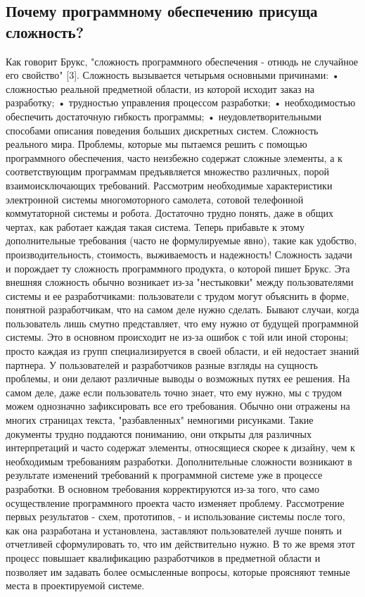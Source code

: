 \documentclass[11pt]{article}
\begin{document}
    	\subsection{Почему программному обеспечению присуща сложность? }
    	Как говорит Брукс, "сложность программного обеспечения - отнюдь не случайное его свойство" [3]. Сложность вызывается четырьмя основными причинами: 
    • сложностью реальной предметной области, из которой исходит заказ на разработку;
    • трудностью управления процессом разработки;
    • необходимостью обеспечить достаточную гибкость программы;
    • неудовлетворительными способами описания поведения больших дискретных систем.
Сложность реального мира. Проблемы, которые мы пытаемся решить с помощью программного обеспечения, часто неизбежно содержат сложные элементы, а к соответствующим программам предъявляется множество различных, порой взаимоисключающих требований. Рассмотрим необходимые характеристики электронной системы многомоторного самолета, сотовой телефонной коммутаторной системы и робота. Достаточно трудно понять, даже в общих чертах, как работает каждая такая система. Теперь прибавьте к этому дополнительные требования (часто не формулируемые явно), такие как удобство, производительность, стоимость, выживаемость и надежность! Сложность задачи и порождает ту сложность программного продукта, о которой пишет Брукс. 
Эта внешняя сложность обычно возникает из-за "нестыковки" между пользователями системы и ее разработчиками: пользователи с трудом могут объяснить в форме, понятной разработчикам, что на самом деле нужно сделать. Бывают случаи, когда пользователь лишь смутно представляет, что ему нужно от будущей программной системы. Это в основном происходит не из-за ошибок с той или иной стороны; просто каждая из групп специализируется в своей области, и ей недостает знаний партнера. У пользователей и разработчиков разные взгляды на сущность проблемы, и они делают различные выводы о возможных путях ее решения. На самом деле, даже если пользователь точно знает, что ему нужно, мы с трудом можем однозначно зафиксировать все его требования. Обычно они отражены на многих страницах текста, "разбавленных" немногими рисунками. Такие документы трудно поддаются пониманию, они открыты для различных интерпретаций и часто содержат элементы, относящиеся скорее к дизайну, чем к необходимым требованиям разработки. 
Дополнительные сложности возникают в результате изменений требований к программной системе уже в процессе разработки. В основном требования корректируются из-за того, что само осуществление программного проекта часто изменяет проблему. Рассмотрение первых результатов - схем, прототипов, - и использование системы после того, как она разработана и установлена, заставляют пользователей лучше понять и отчетливей сформулировать то, что им действительно нужно. В то же время этот процесс повышает квалификацию разработчиков в предметной области и позволяет им задавать более осмысленные вопросы, которые проясняют темные места в проектируемой системе. 
\end{document}
